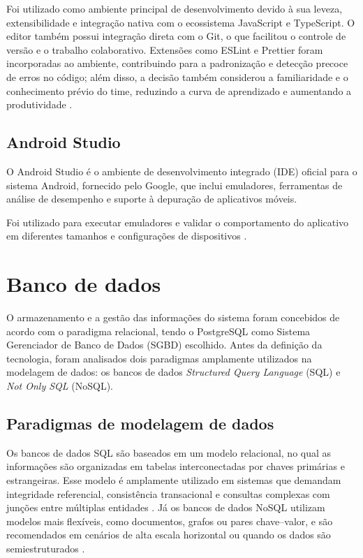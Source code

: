         Foi utilizado como ambiente principal de desenvolvimento devido à sua leveza, extensibilidade e integração nativa com o ecossistema JavaScript e TypeScript. O editor também possui integração direta com o Git, o que facilitou o controle de versão e o trabalho colaborativo. Extensões como ESLint e Prettier foram incorporadas ao ambiente, contribuindo para a padronização e detecção precoce de erros no código; além disso, a decisão também considerou a familiaridade e o conhecimento prévio do time, reduzindo a curva de aprendizado e aumentando a produtividade \cite{vscode_docs}.

        \subsection{Android Studio}
        O Android Studio é o ambiente de desenvolvimento integrado (IDE) oficial para o sistema Android, fornecido pelo Google, que inclui emuladores, ferramentas de análise de desempenho e suporte à depuração de aplicativos móveis.

        Foi utilizado para executar emuladores e validar o comportamento do aplicativo em diferentes tamanhos e configurações de dispositivos \cite{android_studio}.

    \section{Banco de dados}

        O armazenamento e a gestão das informações do sistema foram concebidos de acordo com o paradigma relacional, tendo o PostgreSQL como Sistema Gerenciador de Banco de Dados (SGBD) escolhido. Antes da definição da tecnologia, foram analisados dois paradigmas amplamente utilizados na modelagem de dados: os bancos de dados \textit{Structured Query Language} (SQL) e \textit{Not Only SQL} (NoSQL).

        \subsection{Paradigmas de modelagem de dados}

        Os bancos de dados SQL são baseados em um modelo relacional, no qual as informações são organizadas em tabelas interconectadas por chaves primárias e estrangeiras. Esse modelo é amplamente utilizado em sistemas que demandam integridade referencial, consistência transacional e consultas complexas com junções entre múltiplas entidades \cite{elmasri2016fundamentals}. Já os bancos de dados NoSQL utilizam modelos mais flexíveis, como documentos, grafos ou pares chave–valor, e são recomendados em cenários de alta escala horizontal ou quando os dados são semiestruturados \cite{cattell2011scalable}.

